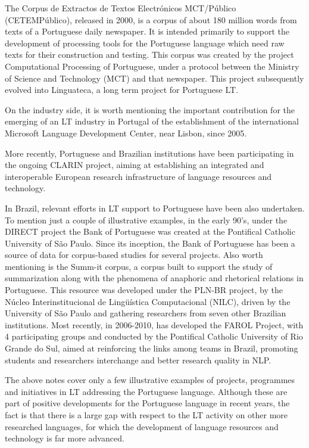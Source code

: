 \documentclass[]{../metanetpaper}
\begin{document}
\begin{multicols}{2}
The Corpus de Extractos de Textos Electrónicos MCT/Público (CETEMPúblico), released in 2000, is a corpus of about 180 million words from texts of a Portuguese daily newspaper. It is intended primarily to support the development of processing tools for the Portuguese language which need raw texts for their construction and testing. This corpus was created by the project Computational Processing of Portuguese, under a protocol between the Ministry of Science and Technology (MCT) and that newspaper. This project subsequently evolved into Linguateca, a long term project for Portuguese LT\cite{linguateca}.

On the industry side, it is worth mentioning the important contribution for the emerging of an LT industry in Portugal of the establishment of the international Microsoft Language Development Center, near Lisbon, since 2005.

More recently, Portuguese and Brazilian institutions have been participating in the ongoing CLARIN project, aiming at establishing an integrated and interoperable European research infrastructure of language resources and technology.

In Brazil, relevant efforts in LT support to Portuguese have been also undertaken. To mention just a couple of illustrative examples, in the early 90's, under the DIRECT project the Bank of Portuguese was created at the Pontifical Catholic University of São Paulo. Since its inception, the Bank of Portuguese has been a source of data for corpus-based studies for several projects. Also worth mentioning is the Summ-it corpus, a corpus built to support the study of summarization along with the phenomena of anaphoric and rhetorical relations in Portuguese. This resource was developed under the PLN-BR project, by the Núcleo Interinstitucional de Lingüística Computacional (NILC), driven by the University of São Paulo and gathering researchers from seven other Brazilian institutions. Most recently, in 2006-2010, has developed the FAROL Project, with 4 participating groups and conducted by the Pontifical Catholic University of Rio Grande do Sul, aimed at reinforcing the links among teams in Brazil, promoting students and researchers interchange and better research quality in NLP.

The above notes cover only a few illustrative examples of projects, programmes and initiatives in LT addressing the Portuguese language. Although these are part of positive developments for the Portuguese language in recent years, the fact is that there is a large gap with respect to the LT activity on other more researched languages, for which the development of language resources and technology is far more advanced. 


\end{multicols}
\end{document}
